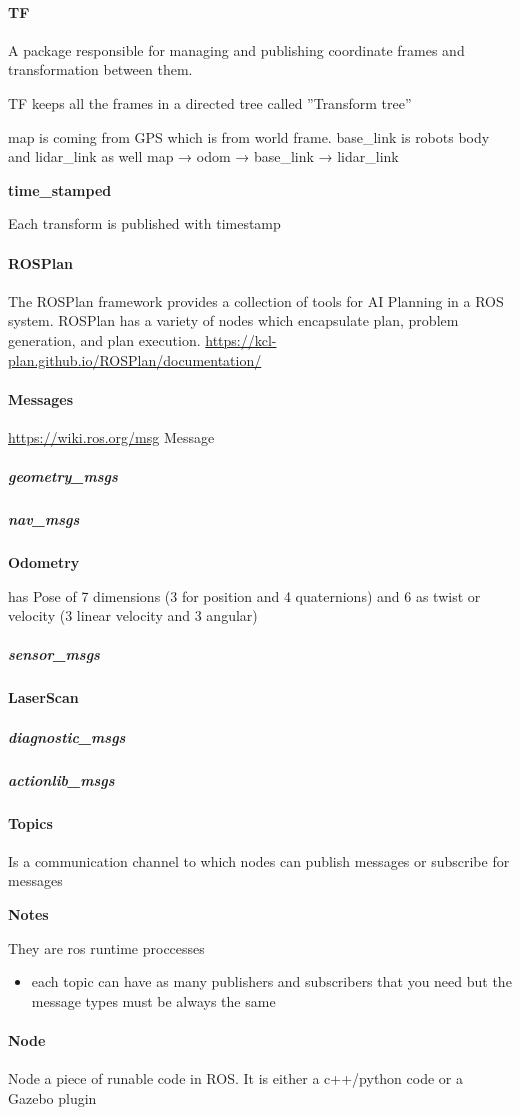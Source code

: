 \documentclass{book}
\providecommand{\ProjectDeepHeading}[2]{%
    \par\medskip\noindent\textbf{#2}\par\smallskip
}
\begin{document}
\paragraph{TF}
    A package responsible for managing and publishing coordinate frames and transformation between them.
    
    TF keeps all the frames in a directed tree called ''Transform tree''
    
    
    map is coming from GPS which is from world frame. base\_link is robots body and lidar\_link as well
    map → odom → base\_link → lidar\_link
    
    \ProjectDeepHeading{2}{time\_stamped}
        Each transform is published with timestamp
        
\paragraph{ROSPlan}
    The ROSPlan framework provides a collection of tools for AI Planning in a ROS system. ROSPlan has a variety of nodes which encapsulate plan, problem generation, and plan execution.
    \url{https://kcl-plan.github.io/ROSPlan/documentation/}
\paragraph{Messages}
    \url{https://wiki.ros.org/msg}
    Message 
    \subparagraph{geometry\_msgs}
    \subparagraph{nav\_msgs}
        \ProjectDeepHeading{2}{Odometry}
            has Pose of 7 dimensions (3 for position and 4 quaternions) and 6 as twist or velocity (3 linear velocity and 3 angular)
    \subparagraph{sensor\_msgs}
        \ProjectDeepHeading{2}{LaserScan}
    \subparagraph{diagnostic\_msgs}
    \subparagraph{actionlib\_msgs}
\paragraph{Topics}
    Is a communication channel to which nodes can publish messages or subscribe for messages

    \ProjectDeepHeading{2}{Notes}
        They are ros runtime proccesses
        \begin{itemize}
            \item each topic can have as many publishers and subscribers that you need but the message types must be always the same
        \end{itemize}
\paragraph{Node}
    Node a piece of runable code in ROS. It is either a c++/python code or a Gazebo plugin
\end{document}

